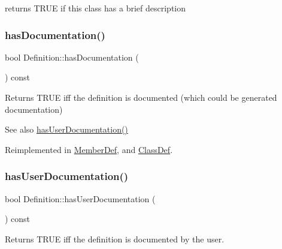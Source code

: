returns T\+R\+UE if this class has a brief description \mbox{\label{class_definition_aa89347609a1643f6c4bc3852d9f773bb}} 
\subsubsection{\texorpdfstring{hasDocumentation()}{hasDocumentation()}}
{\footnotesize\ttfamily bool Definition\+::has\+Documentation (\begin{DoxyParamCaption}{ }\end{DoxyParamCaption}) const\hspace{0.3cm}{\ttfamily [virtual]}}

Returns T\+R\+UE iff the definition is documented (which could be generated documentation) \begin{DoxySeeAlso}{See also}
\mbox{\hyperlink{class_definition_ab1af13aa3951df825dea34f1bcf2a7fc}{has\+User\+Documentation()}} 
\end{DoxySeeAlso}


Reimplemented in \mbox{\hyperlink{class_member_def_aa92ecbdc1c50f61e84d2af414b551d4c}{Member\+Def}}, and \mbox{\hyperlink{class_class_def_acb106b87cabffd7dcf3c7b692f61454b}{Class\+Def}}.

\mbox{\label{class_definition_ab1af13aa3951df825dea34f1bcf2a7fc}} 
\subsubsection{\texorpdfstring{hasUserDocumentation()}{hasUserDocumentation()}}
{\footnotesize\ttfamily bool Definition\+::has\+User\+Documentation (\begin{DoxyParamCaption}{ }\end{DoxyParamCaption}) const\hspace{0.3cm}{\ttfamily [virtual]}}

Returns T\+R\+UE iff the definition is documented by the user. \mbox{\label{class_definition_a33e09971f67fa820e848b769fb718429}} 
